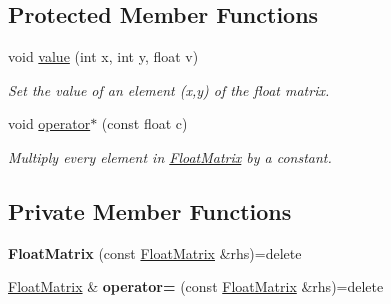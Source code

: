\subsection*{Protected Member Functions}
\begin{DoxyCompactItemize}
\item 
void \hyperlink{classimage__tools_1_1FloatMatrix_a0dd21317c305181c044f2806d4b05d9b}{value} (int x, int y, float v)\hypertarget{classimage__tools_1_1FloatMatrix_a0dd21317c305181c044f2806d4b05d9b}{}\label{classimage__tools_1_1FloatMatrix_a0dd21317c305181c044f2806d4b05d9b}

\begin{DoxyCompactList}\small\item\em Set the value of an element (x,y) of the float matrix. \end{DoxyCompactList}\item 
void \hyperlink{classimage__tools_1_1FloatMatrix_a5bd3e5b9ed8dbf2368abc8d9d703a705}{operator$\ast$} (const float c)\hypertarget{classimage__tools_1_1FloatMatrix_a5bd3e5b9ed8dbf2368abc8d9d703a705}{}\label{classimage__tools_1_1FloatMatrix_a5bd3e5b9ed8dbf2368abc8d9d703a705}

\begin{DoxyCompactList}\small\item\em Multiply every element in \hyperlink{classimage__tools_1_1FloatMatrix}{Float\+Matrix} by a constant. \end{DoxyCompactList}\end{DoxyCompactItemize}
\subsection*{Private Member Functions}
\begin{DoxyCompactItemize}
\item 
{\bfseries Float\+Matrix} (const \hyperlink{classimage__tools_1_1FloatMatrix}{Float\+Matrix} \&rhs)=delete\hypertarget{classimage__tools_1_1FloatMatrix_aa98a295ec659021b206cf46a046a6c2e}{}\label{classimage__tools_1_1FloatMatrix_aa98a295ec659021b206cf46a046a6c2e}

\item 
\hyperlink{classimage__tools_1_1FloatMatrix}{Float\+Matrix} \& {\bfseries operator=} (const \hyperlink{classimage__tools_1_1FloatMatrix}{Float\+Matrix} \&rhs)=delete\hypertarget{classimage__tools_1_1FloatMatrix_abcc8a0e6f9ebf537d7c356dafda3e61d}{}\label{classimage__tools_1_1FloatMatrix_abcc8a0e6f9ebf537d7c356dafda3e61d}

\end{DoxyCompactItemize}
